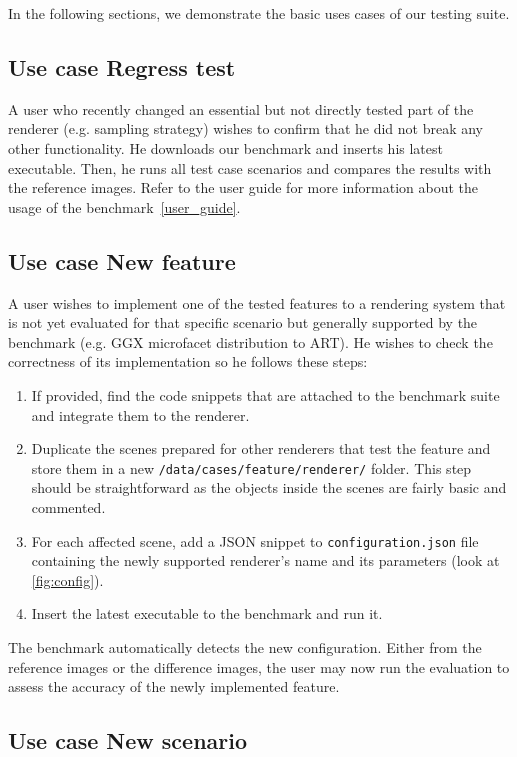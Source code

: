 In the following sections, we demonstrate the basic uses cases of our testing suite.

\subsection{Use case Regress test}

A user who recently changed an essential but not directly tested part of the renderer (e.g. sampling strategy) wishes to confirm that he did not break any other functionality. He downloads our benchmark and inserts his latest executable. Then, he runs all test case scenarios and compares the results with the reference images. Refer to the user guide for more information about the usage of the benchmark~\ref{user_guide}.
 
\subsection{Use case New feature}
\label{sec:frodo}
A user wishes to implement one of the tested features to a rendering system that is not yet evaluated for that specific scenario but generally supported by the benchmark (e.g. GGX microfacet distribution to ART). He wishes to check the correctness of its implementation so he follows these steps:

\begin{enumerate}
	\item If provided, find the code snippets that are attached to the benchmark suite and integrate them to the renderer.
	\item Duplicate the scenes prepared for other renderers that test the feature and store them in a new \texttt{/data/cases/feature/renderer/} folder. This step should be straightforward as the objects inside the scenes are fairly basic and commented.
	\item For each affected scene, add a JSON snippet to \texttt{configuration.json} file containing the newly supported renderer's name and its parameters (look at \autoref{fig:config}).
	\item Insert the latest executable to the benchmark and run it.
\end{enumerate}

The benchmark automatically detects the new configuration. Either from the reference images or the difference images, the user may now run the evaluation to assess the accuracy of the newly implemented feature.

\subsection{Use case New scenario}

